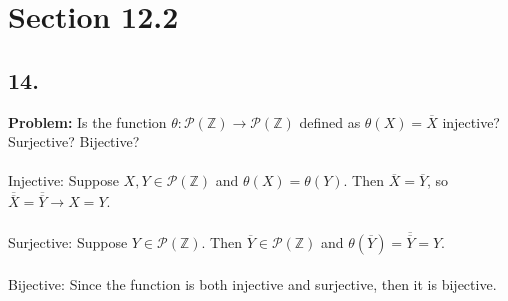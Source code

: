\documentclass[12pt]{article}
\begin{document}
\begin{minipage}[t]{0.45\textwidth}


\section*{Section 12.2}
\subsection*{14.}
\textbf{Problem:} Is the  function $ \theta:\mathscr{P}(\mathbb{Z})\rightarrow\mathscr{P}(\mathbb{Z}) $ defined as $ \theta(X)=\overline{X} $ injective? Surjective? Bijective?
\\\\ Injective: Suppose $ X,Y\in\mathscr{P}(\mathbb{Z}) $ and $ \theta(X)=\theta(Y) $. Then $ \overline{X}=\overline{Y} $, so  $ \overline{\overline{X}}=\overline{\overline{Y}} \rightarrow X=Y $.
\\\\Surjective: Suppose $ Y\in\mathscr{P}(\mathbb{Z}) $. Then $ \overline{Y}\in\mathscr{P}(\mathbb{Z}) $ and $ \theta(\overline{Y})=\overline{\overline{Y}}=Y $.
\\\\Bijective: Since the function is both injective and surjective, then it is bijective.



\end{minipage}
\pagebreak


\end{document}
